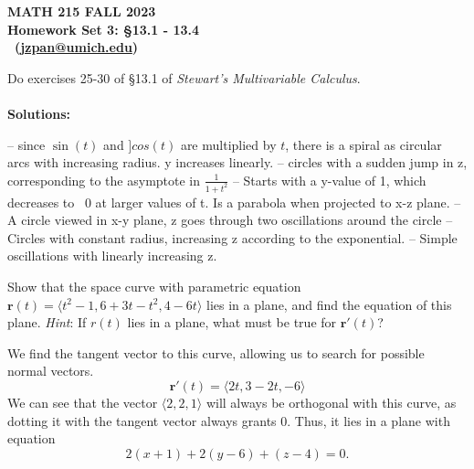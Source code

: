 \documentclass[12pt]{exam}
\author{Zhengyu James Pan} %
\makeatletter
\def\hwName{Homework Set 3: §13.1 - 13.4}
\def\email{jzpan@umich.edu}
\makeatother
\begin{document}
\pagestyle{head}
\firstpageheader{}{}{}
\header{MATH 215}{\hwName}{\thepage}

\printanswers
\unframedsolutions

{\parindent0in
\begin{center}
	\bf MATH 215 FALL 2023\\
	\bf \hwName \\
	\@author\ (\href{mailto:\email}{\email})
\end{center}
}

\begin{questions}
\question Do exercises 25-30 of §13.1 of \textit{Stewart’s Multivariable Calculus}.
	\\\\\textbf{Solutions:}
	\begin{questions}
		\setcounter{question}{24}
		\question {} -- since $\sin(t)$ and $]cos(t)$ are multiplied by $t$, there is a spiral as circular arcs with increasing radius. y increases linearly.
		\question {} -- circles with a sudden jump in z, corresponding to the asymptote in $\frac{1}{1+t^2}$
		\question {} -- Starts with a y-value of 1, which decreases to ~0 at larger values of t. Is a parabola when projected to x-z plane.
		\question {} -- A circle viewed in x-y plane, z goes through two oscillations around the circle
		\question {} -- Circles with constant radius, increasing z according to the exponential.
		\question {} -- Simple oscillations with linearly increasing z.
	\end{questions}
\clearpage
\setcounter{question}{1}
\question Show that the space curve with parametric equation $\mathbf{r}(t) = \langle t^2 - 1, 6 + 3t - t^2, 4 - 6t\rangle$ lies in a plane, and find the equation of this plane. \textit{Hint}: If $r(t)$ lies in a plane, what must be true for $\mathbf{r'}(t)$?
	\begin{solution}
		We find the tangent vector to this curve, allowing us to search for possible normal vectors.
		\[ \mathbf{r'}(t) = \langle 2t, 3 - 2t, -6 \rangle\]
		We can see that the vector $\langle 2, 2, 1 \rangle$ will always be orthogonal with this curve, as dotting it with the tangent vector always grants 0. Thus, it lies in a plane with equation
		\[ \boxed{2(x + 1) + 2(y - 6) + (z - 4) = 0}. \tag*{\qed} \]
	\end{solution}
\clearpage

\question 
\end{questions}
\end{document}
